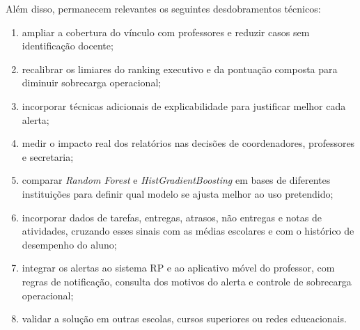 Al\'em disso, permanecem relevantes os seguintes desdobramentos t\'ecnicos:
\begin{enumerate}
    \item ampliar a cobertura do v\'inculo com professores e reduzir casos sem identifica\c{c}\~ao docente;
    \item recalibrar os limiares do ranking executivo e da pontua\c{c}\~ao composta para diminuir sobrecarga operacional;
    \item incorporar t\'ecnicas adicionais de explicabilidade para justificar melhor cada alerta;
    \item medir o impacto real dos relat\'orios nas decis\~oes de coordenadores, professores e secretaria;
    \item comparar \textit{Random Forest} e \textit{HistGradientBoosting} em bases de diferentes institui\c{c}\~oes para definir qual modelo se ajusta melhor ao uso pretendido;
    \item incorporar dados de tarefas, entregas, atrasos, n\~ao entregas e notas de atividades, cruzando esses sinais com as m\'edias escolares e com o hist\'orico de desempenho do aluno;
    \item integrar os alertas ao sistema RP e ao aplicativo m\'ovel do professor, com regras de notifica\c{c}\~ao, consulta dos motivos do alerta e controle de sobrecarga operacional;
    \item validar a solu\c{c}\~ao em outras escolas, cursos superiores ou redes educacionais.
\end{enumerate}
